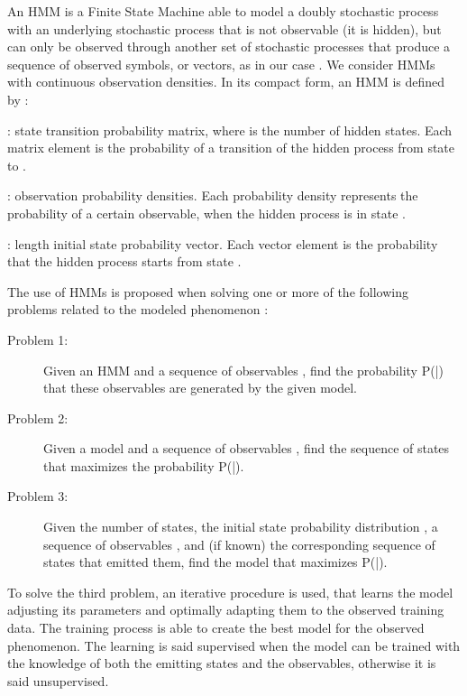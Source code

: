\documentclass[10pt,conference,compsocconf,letterpaper]{IEEEtran}
\begin{document}
An HMM is a Finite State Machine able to model a doubly stochastic
process with an underlying stochastic process that is not observable
(it is hidden), but can only be observed through another set of
stochastic processes that produce a sequence of observed symbols, or
vectors, as in our case \cite{rabiner1989tutorial}. We consider HMMs
with continuous observation densities. In its compact form, an HMM is
defined by :
\begin{description}
\item :  state transition probability matrix,
  where  is the number of hidden states. Each matrix element
   is the probability of a transition of the hidden process
  from state  to .
\item :  observation probability densities. Each
  probability density represents the probability of a certain
  observable, when the hidden process is in state .
\item :  length initial state probability vector. Each
  vector element  is the probability that the hidden process
  starts from state .
\end{description}
The use of HMMs is proposed when solving one or more of the following
problems related to the modeled phenomenon \cite{rabiner1989tutorial}:
\begin{description}
\item[Problem 1:] 
Given an HMM  and a sequence  of observables , find the probability P(|) that
  these observables are generated by the given model.
\item[Problem 2:] Given a model  and a sequence  of
  observables , find the sequence  of
  states  that maximizes the probability
  P(|).
\item[Problem 3:] Given  the number of states, the initial state
  probability distribution , a sequence  of observables
  , and (if known) the corresponding
  sequence  of states  that emitted them,
  find the model  that maximizes P(|).
\end{description}
To solve the third problem, an iterative procedure is used, that
learns the model adjusting its parameters and optimally adapting them
to the observed training data. The training process is able to create
the best model for the observed phenomenon. The learning is said
supervised when the model can be trained with the knowledge of
both the emitting states and the observables, otherwise it is said
unsupervised.
\end{document}
